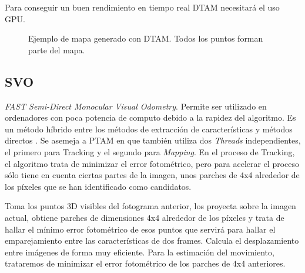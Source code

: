 Para conseguir un buen rendimiento en tiempo real DTAM necesitará el uso GPU.




\begin{figure}[H]
\begin{center}
\end{center}
\caption{Ejemplo de mapa generado con DTAM. Todos los puntos forman parte del mapa.}
\end{figure}

\subsection{SVO}
\textit{FAST Semi-Direct Monocular Visual Odometry}.
Permite ser utilizado en ordenadores con poca potencia de computo debido a la rapidez del algoritmo.
Es un método híbrido entre los métodos de extracción de características y métodos directos
\cite{Forster2017svo}. 
Se asemeja a PTAM en que también utiliza dos \textit{Threads} independientes, el primero para Tracking y el segundo para \textit{Mapping}.
En el proceso de Tracking, el algoritmo trata de minimizar el error fotométrico, pero para acelerar el proceso sólo tiene en cuenta ciertas partes de la imagen, unos parches de 4x4 alrededor de los píxeles que se han identificado como candidatos.

Toma los puntos 3D visibles del fotograma anterior, los proyecta sobre la imagen actual, obtiene parches de dimensiones 4x4 alrededor de los píxeles y trata de hallar  el mínimo error fotométrico de esos puntos que servirá para hallar el emparejamiento entre las características de dos frames. Calcula el desplazamiento entre imágenes de forma muy eficiente.
Para la estimación del movimiento, trataremos de minimizar el error fotométrico de los parches de 4x4 anteriores.


